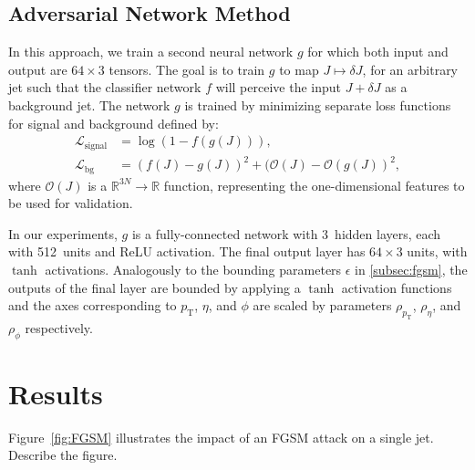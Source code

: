 \documentclass[reprint,nofootinbib,...]{revtex4-1}
\newcommand{\nconst}{64}       %
\newcommand{\nlayerADV}{3}
\newcommand{\nunitsADV}{512}
\newcommand{\pt}{p_\mathrm{T}} %
\begin{document}
\subsection{Adversarial Network Method}

In this approach, we train a second neural network $g$ for which both input and output are $\nconst\times 3$ tensors.
The goal is to train $g$ to map $J\mapsto\delta J$, for an arbitrary jet such that the classifier network $f$ will perceive the input $J+\delta J$ as a background jet.
The network $g$ is trained by minimizing separate loss functions for signal and background defined by:
\begin{align}
\mathcal{L}_\text{signal}&=\log(1-f(g(J))),\\
\mathcal{L}_\text{bg}&=(f(J)-g(J))^2+(\mathcal{O}(J)-\mathcal{O}(g(J))^2,
\end{align}
where $\mathcal{O}(J)$ is a $\mathbb{R}^{3N}\rightarrow \mathbb{R}$ function, representing the one-dimensional features to be used for validation.

In our experiments, $g$ is a fully-connected network with \nlayerADV\ hidden layers, each with \nunitsADV\ units and ReLU activation.
The final output layer has $\nconst\times 3$ units, with $\tanh$ activations.
Analogously to the bounding parameters $\epsilon$ in \ref{subsec:fgsm}, the outputs of the final layer are bounded by applying a $\tanh$ activation functions and the axes corresponding to $\pt$, $\eta$, and $\phi$ are scaled by parameters $\rho_{\pt}$, $\rho_\eta$, and $\rho_\phi$ respectively.



\section{Results}

Figure~\ref{fig:FGSM} illustrates the impact of an FGSM attack on a single jet.   Describe the figure.

\end{document}
